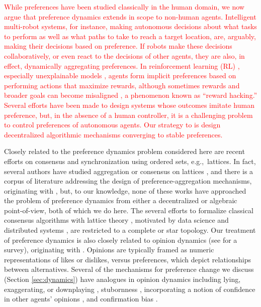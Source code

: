 \documentclass[conference]{ieeeconf}
\begin{document}
\textcolor{red}{While preferences have been studied classically in the human domain, we now argue that preference dynamics extends in scope to non-human agents. Intelligent multi-robot systems, for instance, making autonomous decisions about what tasks to perform as well as what paths to take to reach a target location, are, arguably, making their decisions based on preference. If robots make these decisions collaboratively, or even react to the decisions of other agents, they are also, in effect, dynamically aggregating preferences. In reinforcement learning (RL) \cite{furnkranz2012,wirth2017,natarajan2005}, especially unexplainable models \cite{christiano2017}, agents form implicit preferences based on performing actions that maximize rewards, although sometimes rewards and broader goals can become misaligned \cite{pan2022}, a phenomenon known as ``reward hacking.'' Several efforts \cite{huang2021,korbak2023,ibarz2018} have been made to design systems whose outcomes imitate human preference, but, in the absence of a human controller, it is a challenging problem to control preferences of autonomous agents. Our strategy to is design decentralized algorithmic mechanisms \cite{roughgarden2010} converging to stable preferences.}


Closely related to the preference dynamics problem considered here are recent efforts on consensus \cite{riess2022} and synchronization \cite{riess2023} using ordered sets, e.g.,~lattices. In fact, several authors have studied aggregation or consensus on lattices \cite{karacal2017,chambers2011}, and there is a corpus of literature addressing the design of preference-aggregation mechanisms, originating with \cite{arrow2012}, but, to our knowledge, none of these works have approached the problem of preference dynamics from either a decentralized or algebraic point-of-view, both of which we do here. The several efforts to formalize classical consensus algorithms with lattice theory \cite{barthelemy1991}, motivated by data science \cite{jeanpierre1986} and distributed systems \cite{attiya1995}, are restricted to a complete or star topology. Our treatment of preference dynamics is also closely related to opinion dynamics (see \cite{noorazar2020} for a survey), originating with \cite{degroot1974}. Opinions are typically framed as numeric representations of likes or dislikes, versus preferences, which depict relationships between alternatives. Several of the mechanisms for preference change we discuss (Section \ref{sec:dynamics}) have analogues in opinion dynamics including  lying, exaggerating, or downplaying \cite{hansen2021}, stubornness \cite{ghaderi2014}, incorporating a notion of confidence in other agents' opinions \cite{hegselmann2002,blondel2009}, and confirmation bias \cite{hayhoe2017}.
\end{document}
